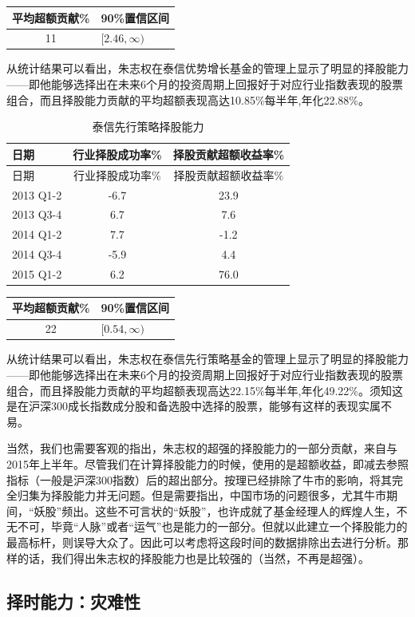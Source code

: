 \documentclass[hyperref,]{ctexart}
\begin{document}
\begin{longtable}[]{@{}cl@{}}
\toprule
平均超额贡献\% & 90\%置信区间\tabularnewline
\midrule
\endhead
11 & \([2.46,\infty)\)\tabularnewline
\bottomrule
\end{longtable}

从统计结果可以看出，朱志权在泰信优势增长基金的管理上显示了明显的择股能力------即他能够选择出在未来6个月的投资周期上回报好于对应行业指数表现的股票组合，而且择股能力贡献的平均超额表现高达10.85\%每半年,年化22.88\%。

\begin{longtable}[]{@{}lcc@{}}
\caption{泰信先行策略择股能力}\tabularnewline
\toprule
日期 & 行业择股成功率\% & 择股贡献超额收益率\%\tabularnewline
\midrule
\endfirsthead
\toprule
日期 & 行业择股成功率\% & 择股贡献超额收益率\%\tabularnewline
\midrule
\endhead
2013 Q1-2 & -6.7 & 23.9\tabularnewline
2013 Q3-4 & 6.7 & 7.6\tabularnewline
2014 Q1-2 & 7.7 & -1.2\tabularnewline
2014 Q3-4 & -5.9 & 4.4\tabularnewline
2015 Q1-2 & 6.2 & 76.0\tabularnewline
\bottomrule
\end{longtable}

\begin{longtable}[]{@{}cl@{}}
\toprule
平均超额贡献\% & 90\%置信区间\tabularnewline
\midrule
\endhead
22 & \([0.54,\infty)\)\tabularnewline
\bottomrule
\end{longtable}

从统计结果可以看出，朱志权在泰信先行策略基金的管理上显示了明显的择股能力------即他能够选择出在未来6个月的投资周期上回报好于对应行业指数表现的股票组合，而且择股能力贡献的平均超额表现高达22.15\%每半年,年化49.22\%。须知这是在沪深300成长指数成分股和备选股中选择的股票，能够有这样的表现实属不易。

当然，我们也需要客观的指出，朱志权的超强的择股能力的一部分贡献，来自与2015年上半年。尽管我们在计算择股能力的时候，使用的是超额收益，即减去参照指标（一般是沪深300指数）后的超出部分。按理已经排除了牛市的影响，将其完全归集为择股能力并无问题。但是需要指出，中国市场的问题很多，尤其牛市期间，``妖股''频出。这些不可言状的``妖股''，也许成就了基金经理人的辉煌人生，不无不可，毕竟``人脉''或者``运气''也是能力的一部分。但就以此建立一个择股能力的最高标杆，则误导大众了。因此可以考虑将这段时间的数据排除出去进行分析。那样的话，我们得出朱志权的择股能力也是比较强的（当然，不再是超强）。

\subsection{择时能力：灾难性}
\end{document}
